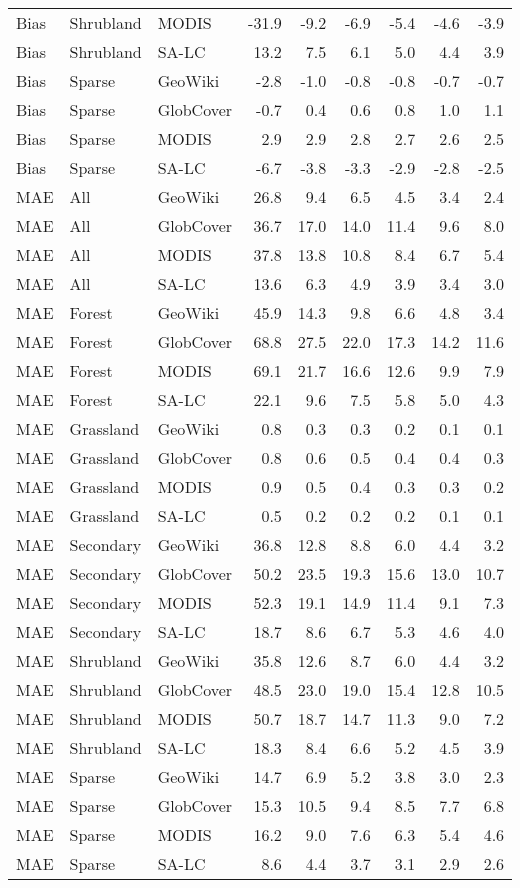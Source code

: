 \begin{longtable}{lllrrrrrr}
  Bias & Shrubland & MODIS & -31.9 & -9.2 & -6.9 & -5.4 & -4.6 & -3.9 \\ 
  Bias & Shrubland & SA-LC & 13.2 & 7.5 & 6.1 & 5.0 & 4.4 & 3.9 \\ 
  Bias & Sparse & GeoWiki & -2.8 & -1.0 & -0.8 & -0.8 & -0.7 & -0.7 \\ 
  Bias & Sparse & GlobCover & -0.7 & 0.4 & 0.6 & 0.8 & 1.0 & 1.1 \\ 
  Bias & Sparse & MODIS & 2.9 & 2.9 & 2.8 & 2.7 & 2.6 & 2.5 \\ 
  Bias & Sparse & SA-LC & -6.7 & -3.8 & -3.3 & -2.9 & -2.8 & -2.5 \\ 
  MAE & All & GeoWiki & 26.8 & 9.4 & 6.5 & 4.5 & 3.4 & 2.4 \\ 
  MAE & All & GlobCover & 36.7 & 17.0 & 14.0 & 11.4 & 9.6 & 8.0 \\ 
  MAE & All & MODIS & 37.8 & 13.8 & 10.8 & 8.4 & 6.7 & 5.4 \\ 
  MAE & All & SA-LC & 13.6 & 6.3 & 4.9 & 3.9 & 3.4 & 3.0 \\ 
  MAE & Forest & GeoWiki & 45.9 & 14.3 & 9.8 & 6.6 & 4.8 & 3.4 \\ 
  MAE & Forest & GlobCover & 68.8 & 27.5 & 22.0 & 17.3 & 14.2 & 11.6 \\ 
  MAE & Forest & MODIS & 69.1 & 21.7 & 16.6 & 12.6 & 9.9 & 7.9 \\ 
  MAE & Forest & SA-LC & 22.1 & 9.6 & 7.5 & 5.8 & 5.0 & 4.3 \\ 
  MAE & Grassland & GeoWiki & 0.8 & 0.3 & 0.3 & 0.2 & 0.1 & 0.1 \\ 
  MAE & Grassland & GlobCover & 0.8 & 0.6 & 0.5 & 0.4 & 0.4 & 0.3 \\ 
  MAE & Grassland & MODIS & 0.9 & 0.5 & 0.4 & 0.3 & 0.3 & 0.2 \\ 
  MAE & Grassland & SA-LC & 0.5 & 0.2 & 0.2 & 0.2 & 0.1 & 0.1 \\ 
  MAE & Secondary & GeoWiki & 36.8 & 12.8 & 8.8 & 6.0 & 4.4 & 3.2 \\ 
  MAE & Secondary & GlobCover & 50.2 & 23.5 & 19.3 & 15.6 & 13.0 & 10.7 \\ 
  MAE & Secondary & MODIS & 52.3 & 19.1 & 14.9 & 11.4 & 9.1 & 7.3 \\ 
  MAE & Secondary & SA-LC & 18.7 & 8.6 & 6.7 & 5.3 & 4.6 & 4.0 \\ 
  MAE & Shrubland & GeoWiki & 35.8 & 12.6 & 8.7 & 6.0 & 4.4 & 3.2 \\ 
  MAE & Shrubland & GlobCover & 48.5 & 23.0 & 19.0 & 15.4 & 12.8 & 10.5 \\ 
  MAE & Shrubland & MODIS & 50.7 & 18.7 & 14.7 & 11.3 & 9.0 & 7.2 \\ 
  MAE & Shrubland & SA-LC & 18.3 & 8.4 & 6.6 & 5.2 & 4.5 & 3.9 \\ 
  MAE & Sparse & GeoWiki & 14.7 & 6.9 & 5.2 & 3.8 & 3.0 & 2.3 \\ 
  MAE & Sparse & GlobCover & 15.3 & 10.5 & 9.4 & 8.5 & 7.7 & 6.8 \\ 
  MAE & Sparse & MODIS & 16.2 & 9.0 & 7.6 & 6.3 & 5.4 & 4.6 \\ 
  MAE & Sparse & SA-LC & 8.6 & 4.4 & 3.7 & 3.1 & 2.9 & 2.6 \\ 
   \hline
\hline
\end{longtable}
